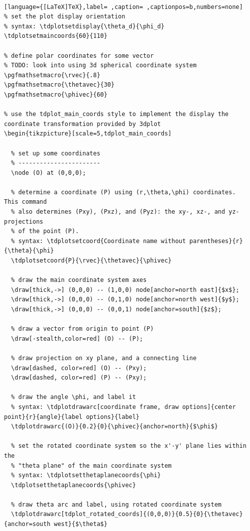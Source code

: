 \documentclass[a4paper,12pt]{article}
\begin{document}
\\[0pt]

\begin{lstlisting}[language={[LaTeX]TeX},label= ,caption= ,captionpos=b,numbers=none]
% set the plot display orientation
% syntax: \tdplotsetdisplay{\theta_d}{\phi_d}
\tdplotsetmaincoords{60}{110}

% define polar coordinates for some vector
% TODO: look into using 3d spherical coordinate system
\pgfmathsetmacro{\rvec}{.8}
\pgfmathsetmacro{\thetavec}{30}
\pgfmathsetmacro{\phivec}{60}

% use the tdplot_main_coords style to implement the display the coordinate transformation provided by 3dplot
\begin{tikzpicture}[scale=5,tdplot_main_coords]

  % set up some coordinates
  % -----------------------
  \node (O) at (0,0,0);

  % determine a coordinate (P) using (r,\theta,\phi) coordinates.  This command
  % also determines (Pxy), (Pxz), and (Pyz): the xy-, xz-, and yz-projections
  % of the point (P).
  % syntax: \tdplotsetcoord{Coordinate name without parentheses}{r}{\theta}{\phi}
  \tdplotsetcoord{P}{\rvec}{\thetavec}{\phivec}

  % draw the main coordinate system axes
  \draw[thick,->] (0,0,0) -- (1,0,0) node[anchor=north east]{$x$};
  \draw[thick,->] (0,0,0) -- (0,1,0) node[anchor=north west]{$y$};
  \draw[thick,->] (0,0,0) -- (0,0,1) node[anchor=south]{$z$};

  % draw a vector from origin to point (P) 
  \draw[-stealth,color=red] (O) -- (P);

  % draw projection on xy plane, and a connecting line
  \draw[dashed, color=red] (O) -- (Pxy);
  \draw[dashed, color=red] (P) -- (Pxy);

  % draw the angle \phi, and label it
  % syntax: \tdplotdrawarc[coordinate frame, draw options]{center point}{r}{angle}{label options}{label}
  \tdplotdrawarc{(O)}{0.2}{0}{\phivec}{anchor=north}{$\phi$}

  % set the rotated coordinate system so the x'-y' plane lies within the
  % "theta plane" of the main coordinate system
  % syntax: \tdplotsetthetaplanecoords{\phi}
  \tdplotsetthetaplanecoords{\phivec}

  % draw theta arc and label, using rotated coordinate system
  \tdplotdrawarc[tdplot_rotated_coords]{(0,0,0)}{0.5}{0}{\thetavec}{anchor=south west}{$\theta$}


\end{lstlisting}
\end{document}

